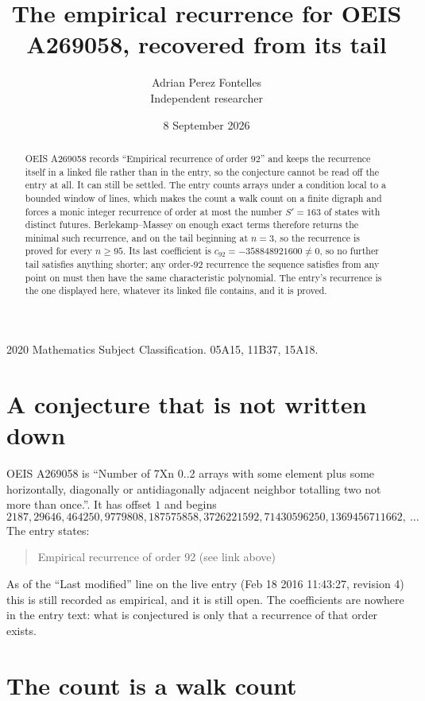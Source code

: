 \documentclass[11pt,a4paper]{article}
\title{The empirical recurrence for OEIS A269058, recovered from its tail}
\author{Adrian Perez Fontelles\\ \small Independent researcher}
\date{8 September 2026}
\theoremstyle{plain}
\theoremstyle{definition}
\begin{document}
\maketitle

\begin{abstract}
OEIS A269058 records ``Empirical recurrence of order $92$'' and keeps the recurrence itself in
a linked file rather than in the entry, so the conjecture cannot be read off the entry at all.
It can still be settled. The entry counts arrays under a condition local to a bounded window of
lines, which makes the count a walk count on a finite digraph and forces a monic integer
recurrence of order at most the number $S'=163$ of states with distinct futures. Berlekamp--Massey on
enough exact terms therefore returns the minimal such recurrence, and on the tail beginning at $n=3$, so the recurrence is proved for every $n\ge95$.
Its last coefficient is $c_{92}=-358848921600\neq0$, so no further tail satisfies anything
shorter; any order-$92$ recurrence the sequence satisfies from any point on must then have
the same characteristic polynomial. The entry's recurrence is the one displayed here, whatever
its linked file contains, and it is proved.
\end{abstract}

\noindent\small 2020 Mathematics Subject Classification. 05A15, 11B37, 15A18.\normalsize

\section{A conjecture that is not written down}

OEIS A269058 is ``Number of 7Xn 0..2 arrays with some element plus some horizontally, diagonally or antidiagonally adjacent neighbor totalling two not more than once.''. It has offset $1$ and begins
\[
2187, 29646, 464250, 9779808, 187575858, 3726221592, 71430596250, 1369456711662,\ \dots
\]
The entry states:
\begin{quote}
Empirical recurrence of order 92 (see link above)
\end{quote}
As of the ``Last modified'' line on the live entry (Feb 18 2016 11:43:27, revision 4)
this is still recorded as empirical, and it is still open. The coefficients are nowhere in the
entry text: what is conjectured is only that a recurrence of that order exists.

\section{The count is a walk count}
\end{document}
